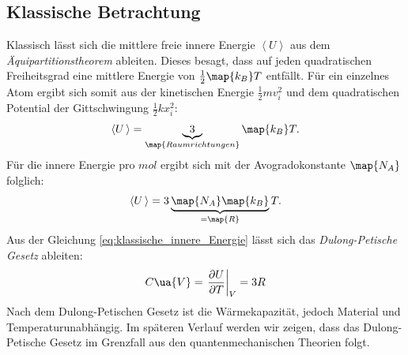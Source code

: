 \subsection{Klassische Betrachtung}
Klassisch lässt sich die mittlere freie innere Energie $\left<U\right>$ aus dem
\emph{Äquipartitionstheorem} ableiten. Dieses besagt, dass auf jeden quadratischen
Freiheitsgrad eine mittlere Energie von $\frac{1}{2}\map{k_B}T$ entfällt.
Für ein einzelnes Atom ergibt sich somit aus der kinetischen Energie $\frac{1}{2}mv_i^2$ und
dem quadratischen Potential der Gittschwingung $\frac{1}{2}kx_i^2$:
\begin{equation}
  \label{eq:innere_Energie}
  \left<U\,\right> = \underbrace{3}_{\map{Raumrichtungen}}\map{k_B}T.
\end{equation}
Für die innere Energie pro $\si{mol}$ ergibt sich mit der Avogradokonstante
$\map{N_A}$ folglich:
\begin{equation}
  \label{eq:klassische_innere_Energie}
  \left<U\,\right> = 3\underbrace{\map{N_A} \map{k_B}}_{=\map{R}} T.
\end{equation}
Aus der Gleichung \eqref{eq:klassische_innere_Energie} lässt sich das
\emph{Dulong-Petische Gesetz} ableiten:
\begin{equation}
  \label{eq:dulong_petit}
  C\ua{V}=\left. \frac{\partial U}{\partial T}\right|_{V}=3R
\end{equation}
Nach dem Dulong-Petischen Gesetz ist die Wärmekapazität, jedoch Material und
Temperaturunabhängig. Im späteren Verlauf werden wir zeigen, dass das Dulong-Petische Gesetz
im Grenzfall aus den quantenmechanischen Theorien folgt.

